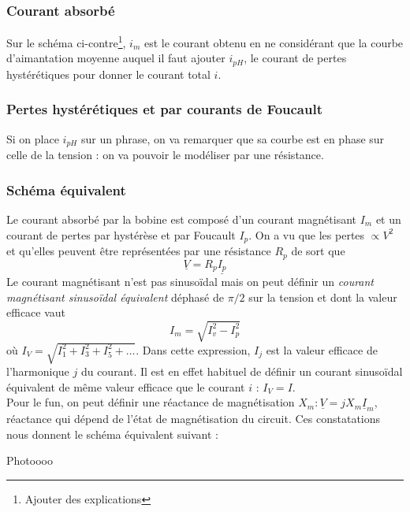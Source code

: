 		\subsubsection{Courant absorbé}
		Sur le schéma ci-contre\footnote{Ajouter des explications}, $i_m$ 
		est le courant obtenu en ne considérant que la courbe d'aimantation 
		moyenne auquel il faut ajouter $i_{pH}$, le courant de pertes 
		hystérétiques pour donner le courant total $i$.
		
		
		\subsubsection{Pertes hystérétiques et par courants de Foucault}
		Si on place $i_{pH}$ sur un phrase, on va remarquer que sa courbe 
		est en phase sur celle de la tension : on va pouvoir le modéliser 
		par une résistance.
		
		\subsubsection{Schéma équivalent}
		Le courant absorbé par la bobine est composé d'un courant 
		magnétisant $I_m$ et un courant de pertes par hystérèse et par 
		Foucault $I_p$. On a vu que les pertes $\propto V^2$ et qu'elles 
		peuvent être représentées par une résistance $R_p$ de sort que 
		\begin{equation}
		\underline{V} = R_p\underline{I_p}
		\end{equation}
		Le courant magnétisant n'est pas sinusoïdal mais on peut définir 
		un \textit{courant magnétisant sinusoïdal équivalent} déphasé de 
		$\pi/2$ sur la tension et dont la valeur efficace vaut 
		\begin{equation}
		I_m= \sqrt{I_v^2-I_p^2}
		\end{equation}
		où $I_V = \sqrt{I_1^2+I_3^2+I_5^2+\dots}$. Dans cette expression, 
		$I_j$ est la valeur efficace de l'harmonique $j$ du courant. Il est 
		en effet habituel de définir un courant sinusoïdal équivalent de  
		même valeur efficace que le courant $i$ : $I_V = I$.\\
		Pour le fun, on peut définir une réactance de magnétisation $X_m : 
		\underline{V} = jX_m\underline{I}_m$, réactance qui dépend de l'état 
		de magnétisation du circuit. Ces constatations nous donnent le 
		schéma équivalent suivant :\\
		\begin{center}
		Photoooo
		\end{center}
		
